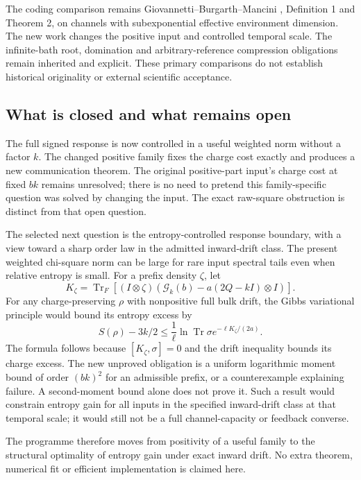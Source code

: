 \documentclass[11pt]{article}
\newcommand{\Tr}{\operatorname{Tr}}
\begin{document}
The coding comparison remains Giovannetti--Burgarth--Mancini \cite{GBM},
Definition 1 and Theorem 2, on channels with subexponential effective
environment dimension. The new work changes the positive input and
controlled temporal scale. The infinite-bath root, domination and
arbitrary-reference compression obligations remain inherited and explicit.
These primary comparisons do not establish historical originality or
external scientific acceptance.

\subsection{What is closed and what remains open}

The full signed response is now controlled in a useful weighted norm
without a factor \(k\). The changed positive family fixes the charge cost
exactly and produces a new communication theorem. The original positive-part
input's charge cost at fixed \(bk\) remains unresolved; there is no need
to pretend this family-specific question was solved by changing the input.
The exact raw-square obstruction is distinct from that open question.

The selected next question is the entropy-controlled response boundary,
with a view toward a sharp order law in the admitted inward-drift class.
The present weighted chi-square norm can be large for rare input spectral
tails even when relative entropy is small. For a prefix density \(\zeta\),
let
\[
 K_\zeta=\Tr_F[(I\otimes\zeta)
       (\mathcal G_k(b)-a(2Q-kI)\otimes I)].
\]
For any charge-preserving \(\rho\) with nonpositive full bulk drift,
the Gibbs variational principle would bound its entropy excess by
\[
 S(\rho)-3k/2
 \le\frac1\ell\ln\Tr\sigma
       e^{-\ell K_\zeta/(2a)}.
\]
The formula follows because \([K_\zeta,\sigma]=0\) and the drift
inequality bounds its charge excess. The new unproved obligation is a
uniform logarithmic moment bound of order \((bk)^2\) for an admissible
prefix, or a counterexample explaining failure. A second-moment bound
alone does not prove it. Such a result would constrain entropy gain for
all inputs in the specified inward-drift class at that temporal scale;
it would still not be a full channel-capacity or feedback converse.

The programme therefore moves from positivity of a useful family to the
structural optimality of entropy gain under exact inward drift. No extra
theorem, numerical fit or efficient implementation is claimed here.

\appendix
\end{document}
